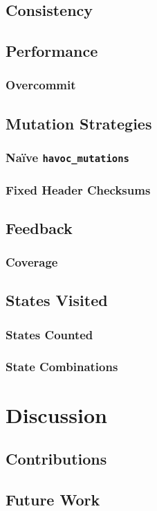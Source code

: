 \documentclass{article}
\begin{document}
\begin{multicols}{2}
  \subsection{Consistency}
  \subsection{Performance}

  \subsubsection{Overcommit}

  \subsection{Mutation Strategies}

  \subsubsection{Naïve \texttt{havoc\_mutations}}

  \subsubsection{Fixed Header Checksums}

  \subsection{Feedback}

  \subsubsection{Coverage}

  \subsection{States Visited}

  \subsubsection{States Counted}

  \subsubsection{State Combinations}

  \section{Discussion}

  \subsection{Contributions}

  \subsection{Future Work}

\end{multicols}
\end{document}
